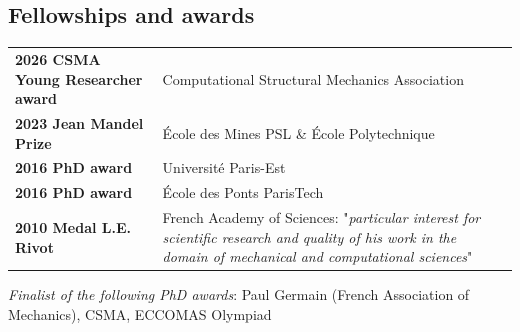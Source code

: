 \subsection*{\textcolor{navier_blue}{Fellowships and awards}}
\begin{table}[H]
{\renewcommand\tabcolsep{2pt}
\vspace{-0.3cm}
\begin{tabularx}{\textwidth}{p{6.5cm}X}
\textbf{2026 CSMA Young Researcher award}  & Computational Structural Mechanics Association\\
\textbf{2023 Jean Mandel Prize}  &  \'Ecole des Mines PSL \& \'Ecole Polytechnique\\
\textbf{2016 PhD award}  & Université Paris-Est \\ 
\textbf{2016 PhD award} & \'Ecole des Ponts ParisTech \\ 
\textbf{2010 Medal L.E. Rivot} & French Academy of Sciences: "\textit{particular interest for scientific research and quality of his work in the domain of mechanical and computational sciences}"
\end{tabularx}}
\textit{Finalist of the following PhD awards}: Paul Germain (French Association of Mechanics), CSMA, ECCOMAS Olympiad
\end{table}